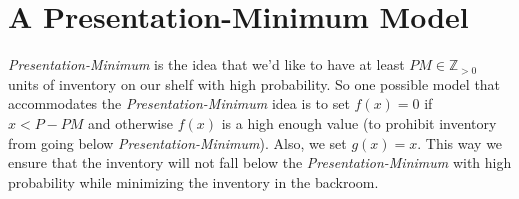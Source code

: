 \documentclass[12pt]{amsart}
\begin{document}
\section{A Presentation-Minimum Model}
{\em Presentation-Minimum} is the idea that we'd like to have at least $PM \in \mathbb{Z}_{>0}$ units of inventory on our shelf with high probability. So one possible model that accommodates the {\em Presentation-Minimum} idea is to set $f(x) = 0$ if $x < P - PM$ and otherwise $f(x)$ is a high enough value (to prohibit inventory from going below {\em Presentation-Minimum}). Also, we set $g(x) = x$. This way we ensure that the inventory will not fall below the {\em Presentation-Minimum} with high probability while minimizing the inventory in the backroom.
\end{document}
